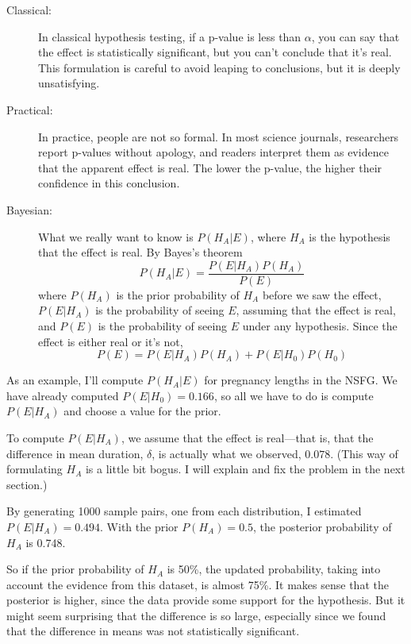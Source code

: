 \documentclass[12pt]{book}
\begin{document}
\begin{description}

\item[Classical:] In classical hypothesis testing, if a p-value
  is less than $\alpha$, you can say that the effect is statistically
  significant, but you can't conclude that it's real.  This
  formulation is careful to avoid leaping to conclusions, but it is
  deeply unsatisfying.

\item[Practical:] In practice, people are not so formal.  In most
  science journals, researchers report p-values without apology, and
  readers interpret them as evidence that the apparent effect is real.
  The lower the p-value, the higher their confidence in this
  conclusion.

\item[Bayesian:] What we really want to know is $P(H_A | E)$, where
  $H_A$ is the hypothesis that the effect is real.  By Bayes's theorem
  \[ P(H_A | E) = \frac{P(E | H_A) P(H_A)}{P(E)} \]
  where $P(H_A)$ is the prior probability of $H_A$ before we saw the
  effect, $P(E | H_A)$ is the probability of seeing $E$, assuming that
  the effect is real, and $P(E)$ is the probability of seeing $E$
  under any hypothesis.  Since the effect is either real or it's not,
  \[ P(E) = P(E | H_A) P(H_A) + P(E | H_0) P(H_0) \]

\end{description}

As an example, I'll compute $P(H_A | E)$ for pregnancy lengths in the
NSFG.  We have already computed $P(E | H_0)=0.166$, so all we have to
do is compute $P(E | H_A)$ and choose a value for the prior.

To compute $P(E | H_A)$, we assume that the effect is real---that is,
that the difference in mean duration, $\delta$, is actually what we
observed, $0.078$.  (This way of formulating $H_A$ is a little bit
bogus.  I will explain and fix the problem in the next section.)

By generating 1000 sample pairs, one from each
distribution, I estimated $P(E | H_A) = 0.494$.  With the prior
$P(H_A)=0.5$, the posterior probability of $H_A$ is 0.748.

So if the prior probability of $H_A$ is 50\%, the updated
probability, taking into account the evidence from this dataset,
is almost 75\%.  It makes sense that the posterior
is higher, since the data provide some support for the hypothesis.
But it might seem surprising that the difference is so large,
especially since we found that the difference in means was not
statistically significant.
\end{document}
